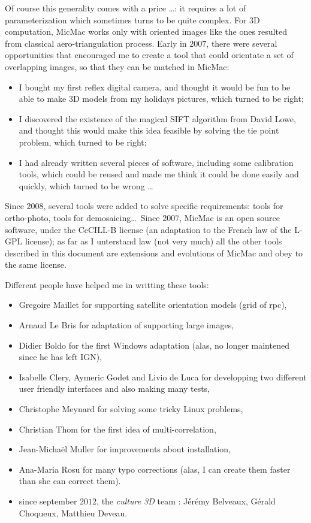 Of course this generality comes with a price \dots : it requires a lot of parameterization
which sometimes turns to be quite complex.  For 3D computation, MicMac works only 
with oriented images like the ones resulted from classical aero-triangulation process. Early
in $2007$, there were several opportunities that encouraged me to create a 
tool that could orientate a set of overlapping images, so that they can be matched in
MicMac:

\begin{itemize}
   \item  I bought my first reflex digital camera, and thought it would be fun
          to be able to make 3D models from my holidays pictures, which turned to be right;

   \item  I discovered the existence of the magical SIFT algorithm from David Lowe, and thought this
          would make this idea feasible by solving the tie point problem, which turned to be right;

   \item  I had already written several pieces of software, including some calibration tools, which
          could be reused and made me think it could be done easily and quickly, which turned to be wrong \dots
\end{itemize}

Since $2008$, several tools were added to solve specific requirements: tools for ortho-photo, tools
for demosaicing\dots \  Since $2007$,  MicMac is an open source software, under the CeCILL-B license
(an adaptation to the French law of the L-GPL license); as far as I unterstand law (not very much) all
the other tools described in this document are extensions and evolutions of MicMac and obey to
the same license.

Different people have helped me in writting these tools:

\begin{itemize}
   \item Gregoire Maillet for supporting satellite orientation models (grid of rpc),
   \item Arnaud Le Bris for adaptation of \SiftPP supporting large images,
   \item Didier Boldo for the first Windows adaptation (alas, no longer maintened since
         he has left IGN),
   \item Isabelle Clery, Aymeric Godet and Livio de Luca for  developping two different user friendly interfaces and
         also making many tests,
   \item Christophe Meynard for solving some tricky Linux problems,
   \item Christian Thom for the first idea of multi-correlation,
   \item Jean-Micha\"el Muller for improvements about installation,
   \item Ana-Maria Rosu for many typo corrections (alas, I can create them faster than she can correct them).
   \item since september $2012$, the \emph{culture 3D} team : J\'ér\'emy Belveaux, G\'erald Choqueux, 
         Matthieu Deveau.
\end{itemize}

